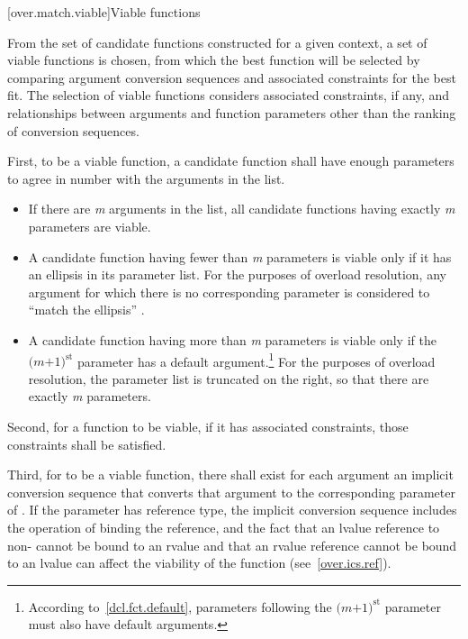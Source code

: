 [over.match.viable]{Viable functions}%

\pnum
From the set of candidate functions constructed for a given
context, a set of viable functions is
chosen, from which the best function will be selected by
comparing argument conversion sequences
and associated constraints
for the best fit.
The selection of viable functions considers
associated constraints, if any, and
relationships between arguments and function parameters other
than the ranking of conversion sequences.

\pnum
{}%
%
First, to be a viable function, a candidate function shall have
enough parameters to agree in number with the arguments in the
list.

\begin{itemize}
\item
If there are
\textit{m}
arguments in the list, all candidate
functions having exactly
\textit{m}
parameters are viable.
\item
A candidate function having fewer than
\textit{m}
parameters is
viable only if it has an ellipsis in its parameter list.
For the purposes of overload resolution,
any argument for which there is no corresponding parameter is
considered to ``match the ellipsis'' .
\item
A candidate function having more than
\textit{m}
parameters is viable
only if the
$\textit{(m+1)}^\text{st}$
parameter has a default
argument.\footnote{According to~\ref{dcl.fct.default},
parameters following the
$\textit{(m+1)}^\text{st}$
parameter must also have default arguments.}
For the purposes of overload
resolution, the parameter list is truncated on the right, so
that there are exactly
\textit{m}
parameters.
\end{itemize}

\pnum
Second, for a function to be viable, if it has associated constraints,
those constraints shall be satisfied.

\pnum
Third, for
to be a viable function, there shall exist for each
argument an
implicit conversion sequence that
converts that argument to the corresponding parameter of
.
If the parameter has reference type, the implicit conversion sequence
includes the operation of binding the reference, and the fact that
an lvalue reference to non- cannot be bound to an rvalue
and that an rvalue reference cannot be bound to an lvalue
can affect
the viability of the function (see~\ref{over.ics.ref}).

